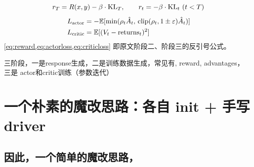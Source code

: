 \documentclass[UTF8,fontset=fandol]{ctexart}
\begin{document}
\begin{equation}\label{eq:reward}
  r_T = R(x,y) - \beta\cdot\KL_T,\qquad r_t = -\beta\cdot\KL_t\ (t<T)
\end{equation}
\begin{align}
  L_{\text{actor}} &= -\mathbb{E}[\min(\rho_t\hat{A}_t,\,
    \mathrm{clip}(\rho_t,1\pm\varepsilon)\hat{A}_t)] \label{eq:actorloss}\\
  L_{\text{critic}} &= \mathbb{E}[(V_t-\text{returns}_t)^2] \label{eq:criticloss}
\end{align}
\cref{eq:reward,eq:actorloss,eq:criticloss} 即原文阶段二、阶段三的反引号公式。

三阶段，一是response生成，二是训练数据生成，常见有, reward, advantages，
三是 actor和critic训练（参数迭代）


\section{一个朴素的魔改思路：各自 init + 手写 driver}
\label{sec:naive}

\subsection{因此，一个简单的魔改思路，}
\end{document}
